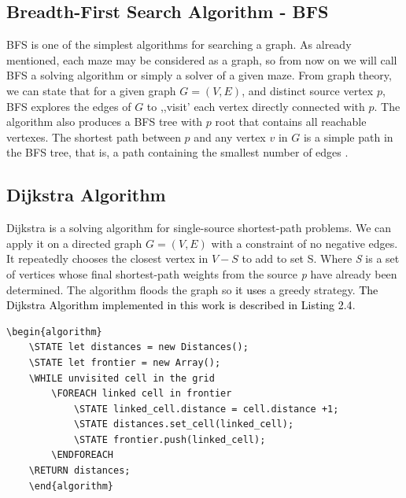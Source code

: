 \subsection{Breadth-First Search Algorithm - BFS}
BFS is one of the simplest algorithms for searching a graph. As already mentioned, each maze may be considered as a graph, so from now on we will call 
BFS  a solving algorithm or simply a solver of a given maze. From graph theory, we can state that for a given graph $ G = ( V, E) $, and distinct source 
vertex $p$, BFS explores the edges of $G$ to ,,visit’ each vertex directly connected with $p$. The algorithm also produces a BFS tree with $p$ root that 
contains all reachable vertexes. The shortest path between $p$ and any vertex $v$ in $G$ is a simple path in the BFS tree, that is, a path containing
the smallest number of edges \cite{16}.

\subsection{Dijkstra Algorithm}
Dijkstra is a solving algorithm for single-source shortest-path problems. We can apply it on a directed graph $G=(V, E)$ with a constraint of no negative edges. 
It repeatedly chooses the closest vertex in $V-S$ to add to set S. 
Where \textit{S} is a set of vertices whose final shortest-path weights from the source \textit{p} have already been determined.
The algorithm floods the graph so \textcolor{black}{it uses} a greedy strategy. \textcolor{black}{The Dijkstra Algorithm implemented in this work is described in Listing 2.4}.
\newline
\\
\begin{lstlisting}[caption={Pseudocode for a Dijkstra’s algorithm}]
	\begin{algorithm}
	\STATE let distances = new Distances();
	\STATE let frontier = new Array();
	\WHILE unvisited cell in the grid
		\FOREACH linked cell in frontier
			\STATE linked_cell.distance = cell.distance +1;
			\STATE distances.set_cell(linked_cell);
			\STATE frontier.push(linked_cell);
	    \ENDFOREACH
	\RETURN distances;
	\end{algorithm}
	\end{lstlisting}

